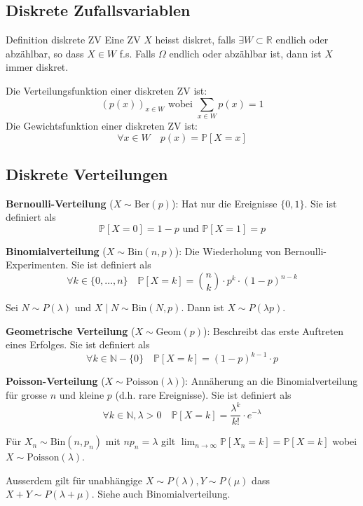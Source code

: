 \documentclass[a4paper,10pt]{article}
\def\R{\mathbb{R}}
\def\P{\mathbb{P}}
\begin{document}
\subsection{Diskrete Zufallsvariablen}
\begin{subbox}{Definition diskrete ZV}
	Eine ZV \(X\) heisst diskret, falls \(\exists W \subset \R\) endlich oder abzählbar, so dass \(X \in W\) f.s. Falls \(\Omega\) endlich oder abzählbar ist, dann ist \(X\) immer diskret.
\end{subbox}
\noindent Die Verteilungsfunktion einer diskreten ZV ist:
\[(p(x))_{x \in W} \text{ wobei } \sum_{x\in W} p(x) = 1\]
Die Gewichtsfunktion einer diskreten ZV ist:
\[\forall x \in W \quad p(x) = \P[X=x]\]

\subsection{Diskrete Verteilungen}
\textbf{Bernoulli-Verteilung} (\(X \sim \text{Ber}(p)\)): Hat nur die Ereignisse \(\{0,1\}\). Sie ist definiert als
\[\P[X=0] = 1-p \text{ und } \P[X=1]=p\]

\noindent \textbf{Binomialverteilung} (\(X \sim \text{Bin}(n,p)\)): Die Wiederholung von Bernoulli-Experimenten. Sie ist definiert als
\[\forall k \in \{0, \ldots, n\} \quad \P[X=k] = \binom{n}{k} \cdot p^k \cdot (1-p)^{n-k}\]

Sei $N \sim P(\lambda)$ und $X \mid N \sim \text{Bin}(N, p)$. Dann ist $X \sim P(\lambda p)$.

\noindent \textbf{Geometrische Verteilung} (\(X \sim \text{Geom}(p)\)): Beschreibt das erste Auftreten eines Erfolges. Sie ist definiert als
\[\forall k \in \mathbb{N} - \{0\} \quad \P[X=k]=(1-p)^{k-1}\cdot p\]

\noindent \textbf{Poisson-Verteilung} (\(X \sim \text{Poisson}(\lambda)\)): Annäherung an die Binomialverteilung für grosse \(n\) und kleine \(p\) (d.h. rare Ereignisse). Sie ist definiert als
\[\forall k \in \mathbb{N}, \lambda > 0 \quad \P[X=k]=\frac{\lambda^k}{k!}\cdot e^{-\lambda}\]

Für $X_n \sim \text{Bin}(n, p_n)$ mit $n p_n = \lambda$ gilt $\lim_{n \to \infty} \P[X_n = k] = \P[X = k]$ wobei $X \sim \text{Poisson}(\lambda)$.

Ausserdem gilt für unabhängige $X \sim P(\lambda), Y \sim P(\mu)$ dass $X + Y \sim P(\lambda + \mu)$. Siehe auch Binomialverteilung.
\end{document}
